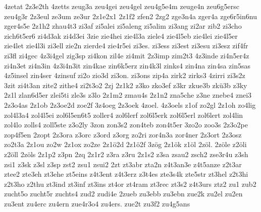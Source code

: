 {    4zetat
    2z3e2th
    4zetts
    zeug3a
    zeu4gei
    zeu4gel
    zeu4g5e4m
    zeuge4n
    zeu6g5ersc
    zeu4g3r
    2z3eul
    ze3um
    ze3ur
    2z1e2x1
    2z1f2
    zfen2
    2zg2
    zge3n4a
    zger4a
    zge6r5in6nu
    zger4s5e
    2z1h2
    zhau4t3
    zi3af
    zi5alei
    zi5aleng
    zi5alim
    zi3ang
    zi2ar
    zib2
    zi3cho
    zich6t5er6
    zi4d3ak
    zi4d3ei
    3zie
    zie4hei
    zie4l3a
    ziele4
    zie4l5eb
    zie4lei
    zie4l5er
    zie4let
    zie4l3i
    zi3ell
    zie2n
    zierde4
    zie4r5ei
    zi3es.
    zi3ess
    zi3est
    zi3esu
    zi3esz
    zif4fr
    zi3fl
    zi4gec
    4z3i4gel
    zig3sp
    zi4kon
    zil4e
    zi4mit
    2z3imp
    zim2t3
    4z3inde
    zi4n5er4z
    zi4n3et
    zi4n3in
    4z3i4n3it
    zin4kae
    zin6k5erz
    zin4k3l
    zinks4
    zin4na
    zin4sa
    zin5sas
    4z5insel
    zin4ser
    4zinsuf
    zi2o
    zio3d
    zi3on.
    zi3ons
    zip4a
    zirk2
    zirks3
    4zirri
    zi3s2z
    3zit
    zi4t3an
    zite2
    zithe4
    zi2t3o2
    2zj
    2z1k2
    z3ko
    zko3ef
    z3kr
    zkue3b
    zkü3b
    z3ky
    2z1l
    zlan6d5er
    zlei5ti
    zle3s
    z3lo
    2z1m2
    zmau4s
    2z1n2
    zna5che
    z3ne
    znebe4
    znei3
    2z3o4as
    2z1ob
    2z3oe2d
    zoe2f
    3z4oeg
    2z3oek
    4zoel.
    4z3oels
    z1of
    zo2gl
    2z1oh
    zo4lig
    zol4l3a4
    zol4l5ei
    zol6l5en6t5
    zoller4
    zol6lerf
    zol6l5erk
    zol6l5erl
    zol6lert
    zol4lin
    zol4lo
    zolls4
    zoll5ste
    z3o2ly
    3zon
    zon3s2
    zon4teb
    zon4t5er
    3zo2o
    zoo3s
    2z3o2pe
    zop4f5en
    2zopt
    2z3ora
    z3orc
    z3ord
    z3org
    zo2ri
    zor4n3a
    zor4ner
    2z3ort
    2z3osz
    zo2t3a
    2z1ou
    zo2w
    2z1ox
    zo2ze
    2z1ö2d
    2z1ö2f
    3zög
    2z1ök
    z1öl
    2zöl.
    2zöle
    z2öli
    z2öll
    2zöls
    2z1p2
    z3pn
    2zq
    2z1r2
    z3ra
    z3ru
    2z1s2
    z3sa
    zsau2
    zsch2
    zse3r4u
    z3sh
    zsi1
    z3sk
    z3sl
    z3sp
    zst2
    zsu1
    zsui2
    2zt
    zt3abr
    zta2n
    z4t3an3e
    z4t5anze
    z2t3ar
    ztee2
    zte3eh
    zt3ehe
    zt5eins
    z4t3ent
    z4t3erz
    z3t4es
    zte3s4k
    zte5str
    zt3hel
    z2t3hi
    z2t3ho
    z2thu
    zt3ind
    zt3inf
    zt3ins
    zt4or
    zt4ram
    zt3rec
    zt3s2
    z4t3urs
    ztz2
    zu1
    zub2
    zucht5o
    zucht5r
    zuchts4
    zud2
    zudi4e
    2zueb
    zu3ebb
    zu3ebn
    zue2k
    zu2el
    zu2en
    zu3ent
    zu4erc
    zu4ern
    zue4r3o4
    zu4ers.
    zue2t
    zu3f2
    zu4g5ans
}
